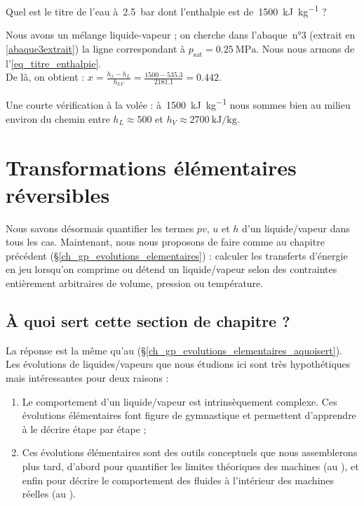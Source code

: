 			\begin{anexample}
			
			Quel est le titre de l’eau à~\SI{2,5}{\bar} dont l’enthalpie est de~\SI{1500}{\kilo\joule\per\kilogram} ?
			
				\begin{answer}
				Nous avons un mélange liquide-vapeur ; on cherche dans l’abaque~n°3 (extrait en \cref{abaque3extrait}) la ligne correspondant à $p_\text{sat} = \SI{0,25}{\mega\pascal}$. Nous nous armons de l’\cref{eq_titre_enthalpie}.\\				
				De là, on obtient : $x = \frac{h_x - h_L}{h_{LV}} = \frac{\num{1500} - \num{535,3}}{\num{2181,1}} = \num{0,442} $.
				\begin{remark}Une courte vérification à la volée : à~\SI{1500}{\kilo\joule\per\kilogram} nous sommes bien au milieu environ du chemin entre $h_L \approx \num{500}$ et $h_V \approx \SI{2700}{\kilo\joule\per\kilogram}$. \end{remark}\end{answer}
			\end{anexample}





\section{Transformations élémentaires réversibles}
\label{ch_lv_evolutions_elementaires}

	Nous savons désormais quantifier les termes $pv$, $u$ et $h$ d’un liquide/vapeur dans tous les cas. Maintenant, nous nous proposons de faire comme au chapitre précédent (\S\ref{ch_gp_evolutions_elementaires}) : calculer les transferts d’énergie en jeu lorsqu’on comprime ou détend un liquide/vapeur selon des contraintes entièrement arbitraires de volume, pression ou température.


	\subsection{À quoi sert cette section de chapitre ?}
	\label{ch_lv_evolutions_elementaires_aquoisert}

		La réponse est la même qu’au \coursquatreshort (\S\ref{ch_gp_evolutions_elementaires_aquoisert}). Les évolutions de liquides/vapeurs que nous étudions ici sont très hypothétiques mais intéressantes pour deux raisons :

		\begin{enumerate}
			\item Le comportement d’un liquide/vapeur est intrinsèquement complexe. Ces évolutions élémentaires font figure de gymnastique et permettent d’apprendre à le décrire étape par étape ;
			\item Ces évolutions élémentaires sont des outils conceptuels que nous assemblerons plus tard, d’abord pour quantifier les limites théoriques des machines (au \coursseptshort), et enfin pour décrire le comportement des fluides à l’intérieur des machines réelles (au \coursneufshort).
		\end{enumerate}


